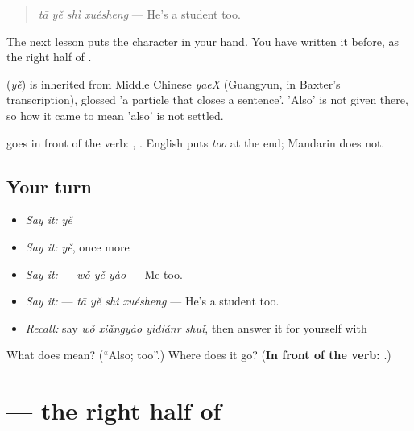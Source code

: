 \begin{quote}
\textbf{} \emph{tā yě shì xuésheng} — He's a student too.
\end{quote}

The next lesson puts the character in your hand. You have written it before, as the right half of .

\begin{cousinweb}
\textbf{} (\emph{yě}) is inherited from Middle Chinese \emph{yaeX} (Guangyun, in Baxter's transcription), glossed 'a particle that closes a sentence'. 'Also' is not given there, so how it came to mean 'also' is not settled.
\end{cousinweb}

\begin{grammarlens}[title={What you've built}]
 goes in front of the verb: , . English puts \emph{too} at the end; Mandarin does not.
\end{grammarlens}

\subsection*{Your turn}
\begin{itemize}
\raggedright
  \item \emph{Say it:} \emph{yě}
  \item \emph{Say it:} \emph{yě}, once more
  \item \emph{Say it:}  — \emph{wǒ yě yào} — Me too.
  \item \emph{Say it:}  — \emph{tā yě shì xuésheng} — He's a student too.
  \item \emph{Recall:} say \emph{wǒ xiǎngyào yìdiǎnr shuǐ}, then answer it for yourself with 
\end{itemize}

\begin{tcolorbox}[breakable,colback=teal!4,colframe=teal!35!black,title={Before you move on}]
What does  mean? (\textquotedblleft{}Also; too\textquotedblright{}.) Where does it go? (\textbf{In front of the verb: }.)
\end{tcolorbox}
\section[\texorpdfstring{\zh{也} (yě)}{也 (yě)}]{ — the right half of }

\label{lesson:ZH-W92-ye}



